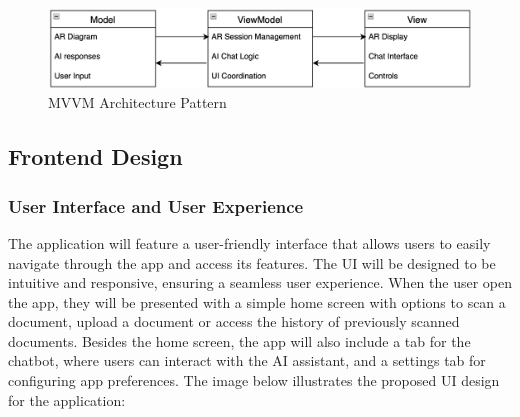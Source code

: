 \documentclass[10pt]{article}
\begin{document}
    \begin{figure}[H]
        \centering
        \includegraphics[width=\textwidth]{img/Pattern.png}
        \caption{MVVM Architecture Pattern}
        \label{fig:Pattern}
    \end{figure}

    \subsection{Frontend Design}

    \subsubsection{User Interface and User Experience}

        The application will feature a user-friendly interface that allows users to easily navigate through the app and access its features. The UI will be designed to be intuitive and responsive, ensuring a seamless user experience. When the user open the app, they will be presented with
        a simple home screen with options to scan a document, upload a document or access the history of previously scanned documents. Besides the home screen, the app will also include a tab for the chatbot, where users can interact with the AI assistant, and a settings tab for configuring
        app preferences. The image below illustrates the proposed UI design for the application:
\end{document}
